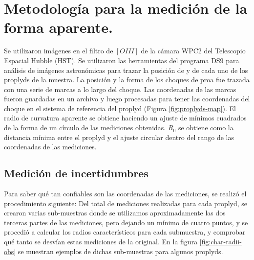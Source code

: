 \section{Metodología para la medición de la forma aparente.}
\label{sec:methodology}
Se utilizaron imágenes en el filtro de $[OIII]$ de la cámara WPC2 del Telescopio
Espacial Hubble (HST). Se utilizaron las herramientas del programa DS9 para
análisis de imágenes astronómicas para trazar la posición de \thC{} y de cada uno
de los proplyds de la muestra. La posición y la forma de los choques de proa fue
trazada con una serie de marcas a lo largo del choque. Las coordenadas de las marcas fueron guardadas en un archivo y luego procesadas para tener las
coordenadas del choque en el sistema de referencia del proplyd (Figura \ref{fig:proplyds-map}). El radio de curvatura aparente se obtiene haciendo un ajuste de mínimos cuadrados de la forma de un círculo de las mediciones obtenidas. $R_0$ se obtiene como la distancia mínima entre el proplyd y el ajuste circular dentro del rango de las coordenadas de las mediciones. 

\subsection{Medición de incertidumbres}

Para saber qué tan confiables son las coordenadas de las mediciones, se realizó
el procedimiento siguiente: Del total de mediciones realizadas para cada proplyd,
se crearon varias sub-muestras donde se utilizamos aproximadamente las dos terceras partes de las mediciones, pero dejando un mínimo de cuatro puntos, y se procedió a calcular los radios característicos para cada submuestra, y comprobar qué tanto se desvían estas mediciones de la original. En la figura \ref{fig:char-radii-obs} se muestran ejemplos de dichas sub-muestras para algunos proplyds.


